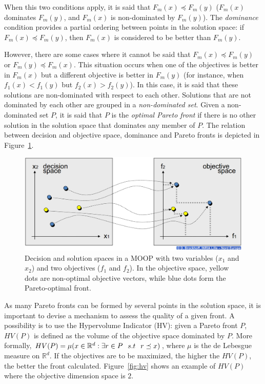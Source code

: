 \documentclass[journal]{IEEEtran}
\begin{document}
When this two conditions apply, it is said that $F_m(x) \preceq F_m(y)$ ($F_m(x)$ dominates $F_m(y)$, and $F_m(x)$ is non-dominated by $F_m(y)$). The \textit{dominance} condition provides a partial ordering between points in the solution space: if $F_m(x) \preceq F_m(y)$, then $F_m(x)$ is considered to be better than $F_m(y)$.

However, there are some cases where it cannot be said that $F_m(x) \preceq F_m(y)$ or $F_m(y) \preceq F_m(x)$. This situation occurs when one of the objectives is better in $F_m(x)$ but a different objective is better in $F_m(y)$ (for instance, when $f_1(x) < f_1(y)$ but $f_2(x) > f_2(y)$). In this case, it is said that these solutions are non-dominated with respect to each other. Solutions that are not dominated by each other are grouped in a \textit{non-dominated set}. Given a non-dominated set $P$, it is said that $P$ is the \textit{optimal Pareto front} if there is no other solution in the solution space that dominates any member of $P$. The relation between decision and objective space, dominance and Pareto fronts is depicted in Figure~\ref{fig:moop}.

\begin{figure} [!t]
	\begin{center}
	\includegraphics[scale=0.235]{img/moopDec.png}
	\caption{Decision and solution spaces in a MOOP with two variables ($x_1$ and $x_2$) and two objectives ($f_1$ and $f_2$). In the objective space, yellow dots are non-optimal objective vectors, while blue dots form the Pareto-optimal front.}
	\label{fig:moop}
	\end{center}
\end{figure}

As many Pareto fronts can be formed by several points in the solution space, it is important to devise a mechanism to assess the quality of a given front. A possibility is to use the Hypervolume Indicator (HV): given a Pareto front $P$, $HV(P)$ is defined as the volume of the objective space dominated by $P$. More formally, $HV(P) = \mu (x \in \mathbb{R}^{d} : \exists r \in P \hspace{0.25cm} s.t \hspace{0.25cm} r \preceq x)$, where $\mu$ is the de Lebesgue measure on $\mathbb{R}^{d}$. If the objectives are to be maximized, the higher the $HV(P)$, the better the front calculated. Figure~\ref{fig:hv} shows an example of $HV(P)$ where the objective dimension space is $2$.
\end{document}
